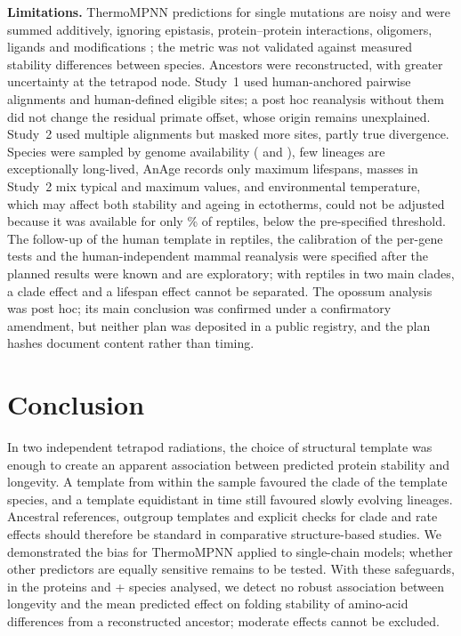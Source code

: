 \documentclass[11pt]{article}
\begin{document}
\textbf{Limitations.} ThermoMPNN predictions for single mutations are noisy and were summed additively, ignoring epistasis, protein--protein interactions, oligomers, ligands and modifications \citep{Dieckhaus2025}; the metric was not validated against measured stability differences between species. Ancestors were reconstructed, with greater uncertainty at the tetrapod node. Study~1 used human-anchored pairwise alignments and human-defined eligible sites; a post hoc reanalysis without them did not change the residual primate offset, whose origin remains unexplained. Study~2 used multiple alignments but masked more sites, partly true divergence. Species were sampled by genome availability (\MNSpecies{} and \RNSpecies), few lineages are exceptionally long-lived, AnAge records only maximum lifespans, masses in Study~2 mix typical and maximum values, and environmental temperature, which may affect both stability and ageing in ectotherms, could not be adjusted because it was available for only \RTempCov\% of reptiles, below the pre-specified threshold. The follow-up of the human template in reptiles, the calibration of the per-gene tests and the human-independent mammal reanalysis were specified after the planned results were known and are exploratory; with \RSReptilesOnlyN{} reptiles in two main clades, a clade effect and a lifespan effect cannot be separated. The opossum analysis was post hoc; its main conclusion was confirmed under a confirmatory amendment, but neither plan was deposited in a public registry, and the plan hashes document content rather than timing.

\section{Conclusion}
In two independent tetrapod radiations, the choice of structural template was enough to create an apparent association between predicted protein stability and longevity. A template from within the sample favoured the clade of the template species, and a template equidistant in time still favoured slowly evolving lineages. Ancestral references, outgroup templates and explicit checks for clade and rate effects should therefore be standard in comparative structure-based studies. We demonstrated the bias for ThermoMPNN applied to single-chain models; whether other predictors are equally sensitive remains to be tested. With these safeguards, in the proteins and \MNSpecies{} + \RNSpecies{} species analysed, we detect no robust association between longevity and the mean predicted effect on folding stability of amino-acid differences from a reconstructed ancestor; moderate effects cannot be excluded.
\end{document}
